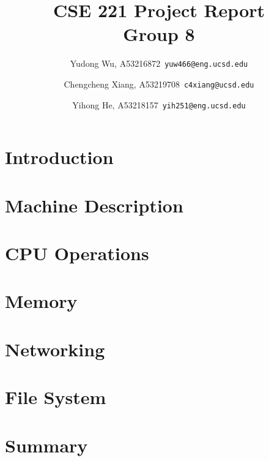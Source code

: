 \documentclass{article}
\begin{document}

\setlength{\parskip}{1em}


\title{CSE 221 Project Report \\
        \large Group 8}

\author{
        Yudong Wu, A53216872\ \texttt{yuw466@eng.ucsd.edu}
        \and
        Chengcheng Xiang, A53219708\ \texttt{c4xiang@ucsd.edu}
        \and
        Yihong He, A53218157\ \texttt{yih251@eng.ucsd.edu}
}

\maketitle

\lstset{
    numbers=left,
    numberstyle=\footnotesize,
    stepnumber=1,
    numbersep=5pt,
    basicstyle=\footnotesize,
    frame=single,
    tabsize=2,
    breaklines=true,
    xleftmargin=2em,
    xrightmargin=2em,
}

\section{Introduction}




\section{Machine Description}



\section{CPU Operations}


\section{Memory}


\section{Networking}


\section{File System}


\section{Summary}





\end{document}
